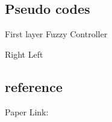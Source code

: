 \subsection*{Pseudo codes}
\begin{algorithm}
	\caption{First layer Fuzzy Controller}\label{fuzzy}
	\begin{algorithmic}[1]
		 \Return Right
		\EndIf
		 \Return Left
		\EndIf
		\EndProcedure
	\end{algorithmic}
\end{algorithm}

\subsection*{reference}
Paper Link:
